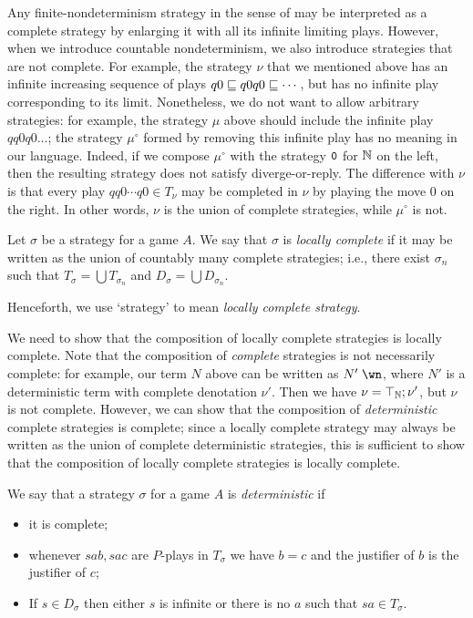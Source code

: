 \documentclass[sigplan,9pt,review]{acmart}\settopmatter{printfolios=true,printccs=false,printacmref=false}
\begin{document}
Any finite-nondeterminism strategy in the sense of \cite{mcCHFiniteND} may be interpreted as a complete strategy by enlarging it with all its infinite limiting plays.  
However, when we introduce countable nondeterminism, we also introduce strategies that are not complete.  
For example, the strategy $\nu$ that we mentioned above has an infinite increasing sequence of plays $q0\sqsubseteq q0q0\sqsubseteq \cdots$, but has no infinite play corresponding to its limit.  
Nonetheless, we do not want to allow arbitrary strategies: for example, the strategy $\mu$ above should include the infinite play $qq0q0\dots$; the strategy $\mu^\circ$ formed by removing this infinite play has no meaning in our language.  
Indeed, if we compose $\mu^\circ$ with the strategy ${\mathtt{0}}$ for $\mathbb{N}$ on the left, then the resulting strategy does not satisfy diverge-or-reply.
The difference with $\nu$ is that every play $qq0\cdots q0\in T_\nu$ may be completed in $\nu$ by playing the move $0$ on the right.
In other words, $\nu$ is the union of complete strategies, while $\mu^\circ$ is not.

\begin{definition}
  Let $\sigma$ be a strategy for a game $A$.  
  We say that $\sigma$ is \emph{locally complete} if it may be written as the union of countably many complete strategies; i.e., there exist $\sigma_n$ such that $T_\sigma=\bigcup T_{\sigma_n}$ and $D_\sigma=\bigcup D_{\sigma_n}$.
\end{definition}

Henceforth, we use `strategy' to mean \emph{locally complete strategy}.

We need to show that the composition of locally complete strategies is locally complete.  
Note that the composition of \emph{complete} strategies is not necessarily complete: for example, our term $N$ above can be written as $N'\;\wn$, where $N'$ is a deterministic term with complete denotation $\nu'$.  
Then we have $\nu=\top_{\mathbb{N}};\nu'$, but $\nu$ is not complete.
However, we can show that the composition of \emph{deterministic} complete strategies is complete; since a locally complete strategy may always be written as the union of complete deterministic strategies, this is sufficient to show that the composition of locally complete strategies is locally complete.

\begin{definition}
  We say that a strategy $\sigma$ for a game $A$ is \emph{deterministic} if
  \begin{itemize}
    \item it is complete;
    \item whenever $sab,sac$ are $P$-plays in $T_\sigma$ we have $b=c$ and the justifier of $b$ is the justifier of $c$;
    \item If $s\in D_\sigma$ then either $s$ is infinite or there is no $a$ such that $sa\in T_\sigma$.
  \end{itemize}
\end{definition}
\end{document}
